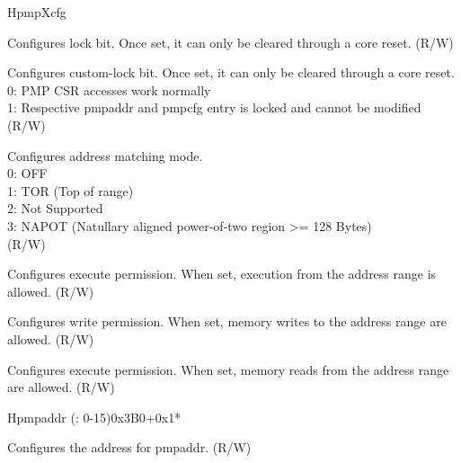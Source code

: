 \begin{register}{H}{pmpXcfg}{}
\label{regdesc:pmpXcfg}%
%
%
%
%
%
%
%
\regnewline%
\begin{regdesc}
\begin{reglist}
\label{fielddesc:pmpXcfgL}\item [L] Configures lock bit. Once set, it can only be cleared through a core reset. (R/W)
\label{fielddesc:pmpXcfgXL}\item [XL] Configures custom-lock bit. Once set, it can only be cleared through a core reset.
0: PMP CSR accesses work normally \\
1: Respective pmpaddr and pmpcfg entry is locked and cannot be modified \\
(R/W)
\label{fielddesc:pmpXcfgA}\item [A] Configures address matching mode.\\
0: OFF \\
1: TOR (Top of range) \\
2: Not Supported \\
3: NAPOT (Natullary aligned power-of-two region >= 128 Bytes)\\
(R/W)
\label{fielddesc:pmpXcfgX}\item [X] Configures execute permission. When set, execution from the address range is allowed. (R/W)
\label{fielddesc:pmpXcfgW}\item [W] Configures write permission. When set, memory writes to the address range are allowed. (R/W)
\label{fielddesc:pmpXcfgR}\item [R] Configures execute permission. When set, memory reads from the address range are allowed. (R/W)
\end{reglist}
\end{regdesc}
\end{register}

\begin{register}{H}{pmpaddr (: 0-15)}{0x3B0+0x1*}\label{regdesc:pmpaddrN}
%
\regnewline%
\begin{regdesc}\begin{reglist}
\label{fielddesc:ADDR}\item [address] Configures the address for pmpaddr. (R/W)
\end{reglist}\end{regdesc}
\end{register}

